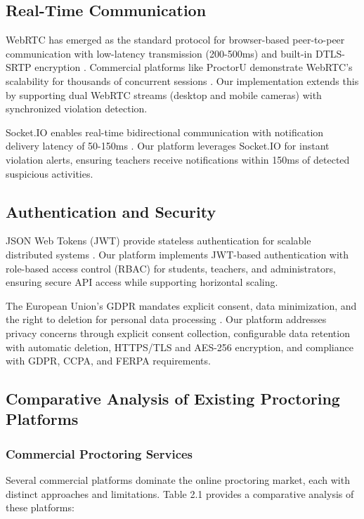 \subsection{Real-Time Communication}

WebRTC has emerged as the standard protocol for browser-based peer-to-peer communication with low-latency transmission (200-500ms) and built-in DTLS-SRTP encryption \cite{webrtc2023}. Commercial platforms like ProctorU demonstrate WebRTC's scalability for thousands of concurrent sessions \cite{proctoru2022}. Our implementation extends this by supporting dual WebRTC streams (desktop and mobile cameras) with synchronized violation detection.

Socket.IO enables real-time bidirectional communication with notification delivery latency of 50-150ms \cite{rauch2016}. Our platform leverages Socket.IO for instant violation alerts, ensuring teachers receive notifications within 150ms of detected suspicious activities.

\subsection{Authentication and Security}

JSON Web Tokens (JWT) provide stateless authentication for scalable distributed systems \cite{jones2015}. Our platform implements JWT-based authentication with role-based access control (RBAC) for students, teachers, and administrators, ensuring secure API access while supporting horizontal scaling.

The European Union's GDPR mandates explicit consent, data minimization, and the right to deletion for personal data processing \cite{gdpr2016}. Our platform addresses privacy concerns through explicit consent collection, configurable data retention with automatic deletion, HTTPS/TLS and AES-256 encryption, and compliance with GDPR, CCPA, and FERPA requirements.

\subsection{Comparative Analysis of Existing Proctoring Platforms}

\subsubsection{Commercial Proctoring Services}

Several commercial platforms dominate the online proctoring market, each with distinct approaches and limitations. Table 2.1 provides a comparative analysis of these platforms:


